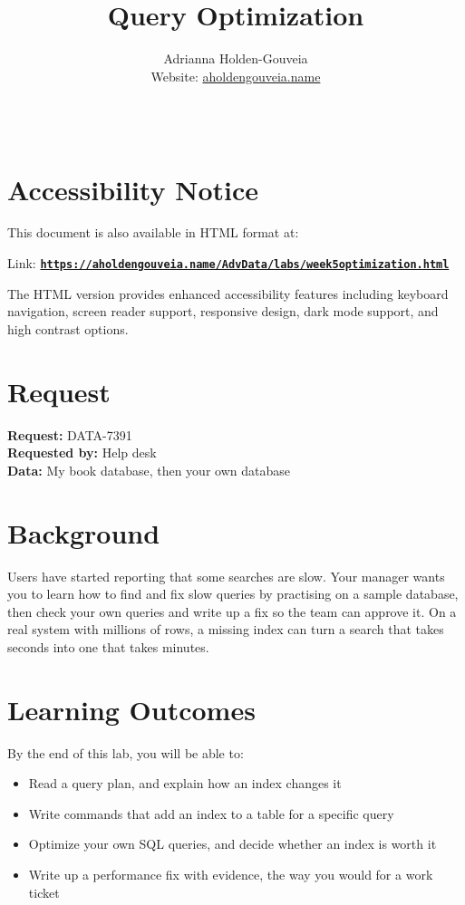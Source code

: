 \documentclass[12pt]{article}
\title{Query Optimization}
\author{
        Adrianna Holden-Gouveia \\
        Website: \href{https://aholdengouveia.name}{aholdengouveia.name}\\ 
        \date{\vspace{-5ex}}
        \faGithub {: aholdengouveia} \\
        }
\begin{document}
    

\maketitle



\section*{Accessibility Notice}
This document is also available in HTML format at:

Link: \href{https://aholdengouveia.name/AdvData/labs/week5optimization.html}{\textbf{\nolinkurl{https://aholdengouveia.name/AdvData/labs/week5optimization.html}}}

The HTML version provides enhanced accessibility features including keyboard navigation, screen reader support, responsive design, dark mode support, and high contrast options.

\section*{Request}
\noindent\textbf{Request:} DATA-7391\\
\textbf{Requested by:} Help desk\\
\textbf{Data:} My book database, then your own database

\section*{Background}
Users have started reporting that some searches are slow. Your manager wants you to learn how to find and fix slow queries by practising on a sample database, then check your own queries and write up a fix so the team can approve it. On a real system with millions of rows, a missing index can turn a search that takes seconds into one that takes minutes.

\section*{Learning Outcomes}
By the end of this lab, you will be able to:
\begin{itemize}
    \item Read a query plan, and explain how an index changes it
    \item Write commands that add an index to a table for a specific query
    \item Optimize your own SQL queries, and decide whether an index is worth it
    \item Write up a performance fix with evidence, the way you would for a work ticket
\end{itemize}
\end{document}
